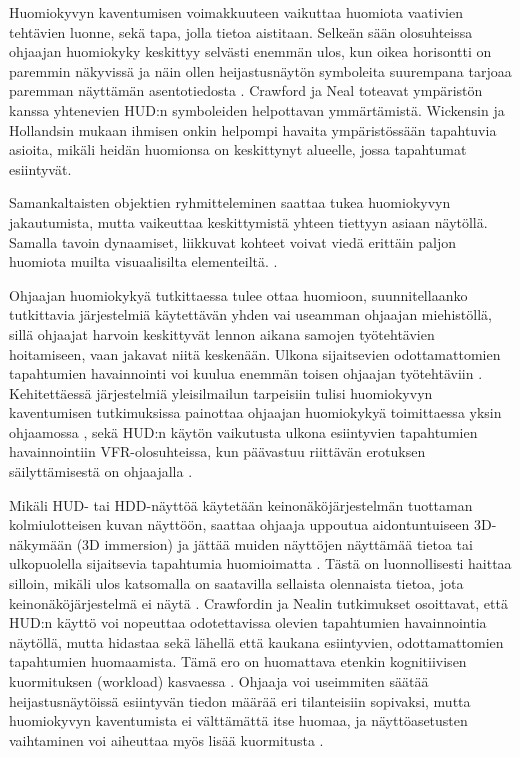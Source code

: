 \documentclass[utf8,bachelor,manualbib]{gradu3}
\begin{document}
Huomiokyvyn kaventumisen voimakkuuteen vaikuttaa huomiota vaativien tehtävien luonne, sekä tapa, jolla tietoa aistitaan. Selkeän sään olosuhteissa ohjaajan huomiokyky keskittyy selvästi enemmän ulos, kun oikea horisontti on paremmin näkyvissä ja näin ollen heijastusnäytön symboleita suurempana tarjoaa paremman näyttämän asentotiedosta \citep{ververswickens1998}. Crawford ja Neal \citeyearpar{crawfordneal2006} toteavat ympäristön kanssa yhtenevien HUD:n symboleiden helpottavan ymmärtämistä. Wickensin ja Hollandsin mukaan \citeyearpar{wickenshollands2000} ihmisen onkin helpompi havaita ympäristössään tapahtuvia asioita, mikäli heidän huomionsa on keskittynyt alueelle, jossa tapahtumat esiintyvät.

Samankaltaisten objektien ryhmitteleminen saattaa tukea huomiokyvyn jakautumista, mutta vaikeuttaa keskittymistä yhteen tiettyyn asiaan näytöllä. Samalla tavoin dynaamiset, liikkuvat kohteet voivat viedä erittäin paljon huomiota muilta visuaalisilta elementeiltä. \citep{crawfordneal2006}.

Ohjaajan huomiokykyä tutkittaessa tulee ottaa huomioon, suunnitellaanko tutkittavia järjestelmiä käytettävän yhden vai useamman ohjaajan miehistöllä, sillä ohjaajat harvoin keskittyvät lennon aikana samojen työtehtävien hoitamiseen, vaan jakavat niitä keskenään. Ulkona sijaitsevien odottamattomien tapahtumien havainnointi voi kuulua enemmän toisen ohjaajan työtehtäviin \citep{crawfordneal2006}. Kehitettäessä järjestelmiä yleisilmailun tarpeisiin tulisi huomiokyvyn kaventumisen tutkimuksissa painottaa ohjaajan huomiokykyä toimittaessa yksin ohjaamossa \citep{crawfordneal2006}, sekä HUD:n käytön vaikutusta ulkona esiintyvien tapahtumien havainnointiin VFR-olosuhteissa, kun päävastuu riittävän erotuksen säilyttämisestä on ohjaajalla \citep{ververswickens1998}.

Mikäli HUD- tai HDD-näyttöä käytetään keinonäköjärjestelmän tuottaman kolmiulotteisen kuvan näyttöön, saattaa ohjaaja uppoutua aidontuntuiseen 3D-näkymään (3D immersion) ja jättää muiden näyttöjen näyttämää tietoa tai ulkopuolella sijaitsevia tapahtumia huomioimatta \citep{olmosym2000}. Tästä on luonnollisesti haittaa silloin, mikäli ulos katsomalla on saatavilla sellaista olennaista tietoa, jota keinonäköjärjestelmä ei näytä \citep{foylehooey2003}. Crawfordin ja Nealin \citeyearpar{crawfordneal2006} tutkimukset osoittavat, että HUD:n käyttö voi nopeuttaa odotettavissa olevien tapahtumien havainnointia näytöllä, mutta hidastaa sekä lähellä että kaukana esiintyvien, odottamattomien tapahtumien huomaamista. Tämä ero on huomattava etenkin kognitiivisen kuormituksen (workload) kasvaessa \citep{larishwickens1991}. Ohjaaja voi useimmiten säätää heijastusnäytöissä esiintyvän tiedon määrää eri tilanteisiin sopivaksi, mutta huomiokyvyn kaventumista ei välttämättä itse huomaa, ja näyttöasetusten vaihtaminen voi aiheuttaa myös lisää kuormitusta \citep{kimkaber2014}.
\end{document}
